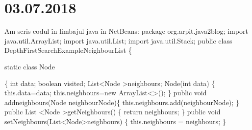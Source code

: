 \documentclass{report}
\begin{document}
\chapter{03.07.2018}
Am scris codul în limbajul java în NetBeans:
\newline
package org.arpit.java2blog;\newline
import java.util.ArrayList;\newline
import java.util.List;\newline
import java.util.Stack;\newline
\newline
public class DepthFirstSearchExampleNeighbourList\newline
\{
 
	static class Node
    
	\{\newline
		\hspace*{1cm} int data;\newline
		\hspace*{1cm}boolean visited;\newline
		\hspace*{1cm}List\textless Node \textgreater neighbours;\newline
 \newline
		\hspace*{1cm}Node(int data)\newline
		\hspace*{1cm}\{\newline
			\hspace*{1.5cm}this.data=data;\newline
			\hspace*{1.5cm}this.neighbours=new ArrayList\textless \textgreater();\newline
		\hspace*{1cm}\}\newline
		\hspace*{1cm}public void addneighbours(Node neighbourNode)\{\newline
			\hspace*{1,5cm}this.neighbours.add(neighbourNode);\newline
		\hspace*{1cm}\}\newline
		\hspace*{1cm}public List \textless Node \textgreater getNeighbours() \{\newline
			\hspace*{1,5cm}return neighbours;\newline
		\hspace*{1cm}\}\newline
		\hspace*{1cm}public void setNeighbours(List\textless Node\textgreater neighbours) \{\newline
			\hspace*{1,5cm}this.neighbours = neighbours;\newline
		\hspace*{1cm}\}
        
\end{document}
